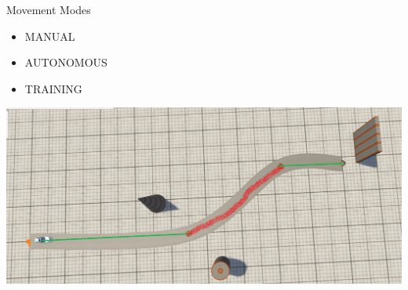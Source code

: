 \documentclass[aspectratio=169]{beamer}
\begin{document}
\begin{frame}{Movement Modes}
    \setlength{\columnsep}{-6cm}
    \begin{multicols}{2}
        \begin{itemize}[<+(1)->] %
            \item MANUAL
            \item AUTONOMOUS
            \item TRAINING
        \end{itemize}
        \pause%
        \includegraphics[width=\linewidth]{media/2019-06-05_ParticipantMovement.png} %
    \end{multicols}
\end{frame}
\end{document}
